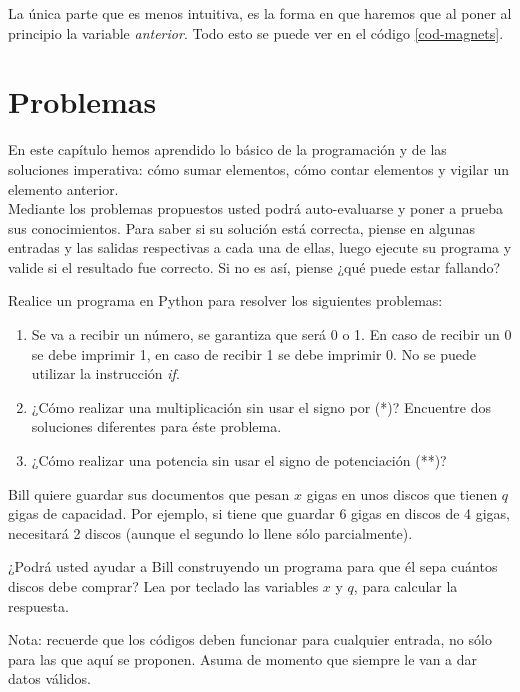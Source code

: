 La única parte que es menos intuitiva, es la forma en que haremos que al poner al principio la variable \emph{anterior}. Todo esto se puede ver en el código \ref{cod-magnets}. \\

 
 
 
\newpage
\section{Problemas}
En este capítulo hemos aprendido lo básico de la programación y de las soluciones imperativa: cómo sumar elementos, cómo contar elementos y vigilar un elemento anterior. \\

Mediante los problemas propuestos usted podrá auto-evaluarse y poner a prueba sus conocimientos. Para saber si su solución está correcta, piense en algunas entradas y las salidas respectivas a cada una de ellas, luego ejecute su programa y valide si el resultado fue correcto. Si no es así, piense ¿qué puede estar fallando?

\vfill

\begin{Exercise}[title={Calentamiento}]
Realice un programa en Python para resolver los siguientes problemas:
\begin{enumerate}
\item Se va a recibir un número, se garantiza que será 0 o 1. En caso de recibir un 0 se debe imprimir 1, en caso de recibir 1 se debe imprimir 0. No se puede utilizar la instrucción \emph{if}.

\item ¿Cómo realizar una multiplicación sin usar el signo por (*)? Encuentre dos soluciones diferentes para éste problema.

\item ¿Cómo realizar una potencia sin usar el signo de potenciación (**)?
\end{enumerate}
\end{Exercise}
\begin{Answer}


\newpage
\end{Answer}
\vfill
\begin{Exercise}[title={La Copia de Seguridad}]
Bill quiere guardar sus documentos que pesan $x$ gigas en unos discos que tienen $q$ gigas de capacidad. Por ejemplo, si tiene que guardar 6 gigas en discos de 4 gigas, necesitará 2 discos (aunque el segundo lo llene sólo parcialmente).

¿Podrá usted ayudar a Bill construyendo un programa para que él sepa cuántos discos debe comprar? Lea por teclado las variables $x$ y $q$, para calcular la respuesta.

Nota: recuerde que los códigos deben funcionar para cualquier entrada, no sólo para las que aquí se proponen. Asuma de momento que siempre le van a dar datos válidos.

\end{Exercise}

